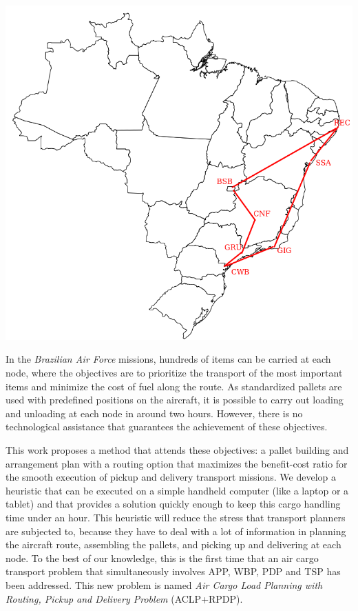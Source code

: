 \documentclass[preprint,authoryear]{elsarticle}
\begin{document}
\begin{table}[H]
\begin{minipage}{0.45\linewidth}
	\end{minipage}\hfill %
	\begin{minipage}{0.50\linewidth}
		\centering
		\includegraphics[scale=0.25]{Images/nodes.png}
		\label{fig:nodes}		
	\end{minipage}
\end{table}


In the {\it Brazilian Air Force}\/ missions, hundreds of items can be carried at each node, where the objectives are to prioritize the transport of the most important items and minimize the cost of fuel along the route. As standardized pallets are used with predefined positions on the aircraft, it is possible to carry out loading and unloading at each node in around two hours. However, there is no technological assistance that guarantees the achievement of these objectives.

This work proposes a method that attends these objectives: a pallet building and arrangement plan with a routing option that maximizes the benefit-cost ratio for the smooth execution of pickup and delivery transport missions. We develop a heuristic that can be executed on a simple handheld computer (like a laptop or a tablet) and that provides a solution quickly enough to keep this cargo handling time under an hour. This heuristic will reduce the stress that transport planners are subjected to, because they have to deal with a lot of information in planning the aircraft route, assembling the pallets, and picking up and delivering at each node. To the best of our knowledge, this is the first time that an air cargo transport problem that simultaneously involves APP, WBP, PDP and TSP has been addressed. This new problem is named {\it Air Cargo Load Planning with Routing, Pickup and Delivery Problem} (ACLP+RPDP).
\end{document}
